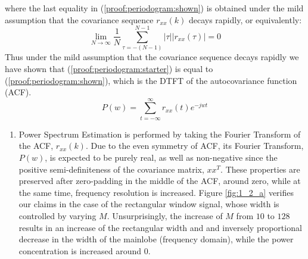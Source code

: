 %
where the last equality in (\ref{proof:periodogram:shown}) is obtained under the mild assumption that the
covariance sequence $r_{xx}(k)$ decays rapidly, or equivalently:
%
\begin{equation}
    \lim_{N\to\infty} \frac{1}{N} \sum_{\tau=-(N-1)}^{N-1} |\tau| |r_{xx}(\tau)| = 0
\label{proof:periodogram:decaying-covariance}
\end{equation}
%
Thus under the mild assumption that the covariance sequence decays rapidly we have shown that (\ref{proof:periodogram:starter})
is equal to (\ref{proof:periodogram:shown}), which is the DTFT of the autocovariance function (ACF).
%
\begin{equation}
    P(w) = \sum_{t=-\infty}^{\infty} r_{xx}(t) e^{-jwt}
\end{equation}

\begin{enumerate}[label=\alph*), leftmargin=*]
\item
%

Power Spectrum Estimation is performed by taking the Fourier Transform of the ACF, $r_{xx}(k)$. Due to the even symmetry of ACF,
its Fourier Transform, $P(w)$, is expected to be purely real, as well as non-negative since the positive semi-definiteness of the
covariance matrix, $xx^{T}$. These properties are preserved after zero-padding in the middle of the ACF, around zero, while at the
same time, frequency resolution is increased. Figure \ref{fig:1_2_a} verifies our claims in the case of the rectangular window signal,
whose width is controlled by varying $M$. Unsurprisingly, the increase of $M$ from $10$ to $128$ results in an increase of the rectangular
width and and inversely proportional decrease in the width of the mainlobe (frequency domain), while the power concentration is increased
around 0.


\end{enumerate}
